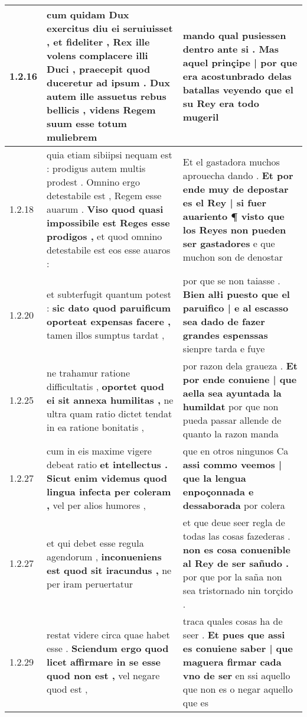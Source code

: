 \begin{tabular}{|p{1cm}|p{6.5cm}|p{6.5cm}|}
1.2.16 & cum quidam Dux exercitus diu ei seruiuisset , et fideliter , Rex ille volens complacere illi Duci , \textbf{ praecepit quod duceretur ad ipsum . Dux autem ille assuetus rebus bellicis , } videns Regem suum esse totum muliebrem & mando qual pusiessen dentro ante si . \textbf{ Mas aquel prinçipe | por que era acostunbrado delas batallas } veyendo que el su Rey era todo mugeril \\\hline
1.2.18 & quia etiam sibiipsi nequam est : prodigus autem multis prodest . Omnino ergo detestabile est , Regem esse auarum . \textbf{ Viso quod quasi impossibile est Reges esse prodigos , } et quod omnino detestabile est eos esse auaros : & Et el gastadora muchos aprouecha dando . \textbf{ Et por ende muy de depostar es el Rey | si fuer auariento ¶ visto que los Reyes non pueden ser gastadores } e que muchon son de denostar \\\hline
1.2.20 & et subterfugit quantum potest : \textbf{ sic dato quod paruificum oporteat expensas facere , } tamen illos sumptus tardat , & por que se non taiasse . \textbf{ Bien alłi puesto que el paruifico | e al escasso sea dado de fazer grandes espenssas } sienpre tarda e fuye \\\hline
1.2.25 & ne trahamur ratione difficultatis , \textbf{ oportet quod ei sit annexa humilitas , } ne ultra quam ratio dictet tendat in ea ratione bonitatis , & por razon dela graueza . \textbf{ Et por ende conuiene | que aella sea ayuntada la humildat } por que non pueda passar allende de quanto la razon manda \\\hline
1.2.27 & cum in eis maxime vigere debeat ratio \textbf{ et intellectus . Sicut enim videmus quod lingua infecta per coleram , } vel per alios humores , & que en otros ningunos Ca \textbf{ assi commo veemos | que la lengua enpoçonnada e dessaborada } por colera \\\hline
1.2.27 & et qui debet esse regula agendorum , \textbf{ inconueniens est quod sit iracundus , } ne per iram peruertatur & et que deue seer regla de todas las cosas fazederas . \textbf{ non es cosa conuenible al Rey de ser sañudo . } por que por la saña non sea tristornado nin torçido . \\\hline
1.2.29 & restat videre circa quae habet esse . \textbf{ Sciendum ergo quod licet affirmare in se esse quod non est , } vel negare quod est , & traca quales cosas ha de seer . \textbf{ Et pues que assi es conuiene saber | que maguera firmar cada vno de ser } en ssi aquello que non es o negar aquello que es \\\hline

\end{tabular}
